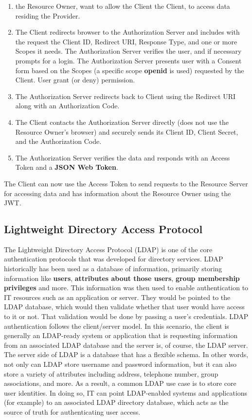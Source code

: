 \begin{enumerate}
	\item the Resource Owner, want to allow the Client the Client, to access data residing the Provider.
	
	\item The Client redirects browser to the Authorization Server and includes with the request the Client ID, Redirect URI, Response Type, and one or more Scopes it needs. The Authorization Server verifies the user, and if necessary prompts for a login. The Authorization Server presents user with a Consent form based on the Scopes (a specific scope \textbf{openid} is used) requested by the Client. User grant (or deny) permission.
	
	\item The Authorization Server redirects back to Client using the Redirect URI along with an Authorization Code.
	
	\item The Client contacts the Authorization Server directly (does not use the Resource Owner’s browser) and securely sends its Client ID, Client Secret, and the Authorization Code.
	
	\item The Authorization Server verifies the data and responds with an Access Token and a \textbf{JSON Web Token}.
\end{enumerate}
	The Client can now use the Access Token to send requests to the Resource Server for accessing data and has information about the Resource Owner using the JWT.
	

\subsection{Lightweight Directory Access Protocol}

The Lightweight Directory Access Protocol (LDAP) is one of the core authentication protocols that was developed for directory services. LDAP historically has been used as a database of information, primarily storing information like \textbf{users}, \textbf{attributes about those users}, \textbf{group membership privileges} and more. This information was then used to enable authentication to IT resources such as an application or server. They would be pointed to the LDAP database, which would then validate whether that user would have access to it or not. That validation would be done by passing a user’s credentials. LDAP authentication follows the client/server model. In this scenario, the client is generally an LDAP-ready system or application that is requesting information from an associated LDAP database and the server is, of course, the LDAP server. The server side of LDAP is a database that has a flexible schema. In other words, not only can LDAP store username and password information, but it can also store a variety of attributes including address, telephone number, group associations, and more. As a result, a common LDAP use case is to store core user identities. In doing so, IT can point LDAP-enabled systems and applications (for example) to an associated LDAP directory database, which acts as the source of truth for authenticating user access.

